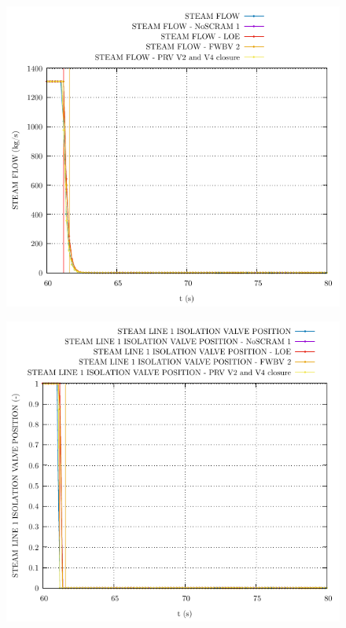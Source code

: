 \documentclass{article}
\begin{document}
\begin{multicols}{2}
\begin{figure}[H]
\includegraphics[width=\linewidth]{./graphs/STEAM FLOW.pdf}
\end{figure}
\begin{figure}[H]
\centering
\includegraphics[width=\linewidth]{./graphs/STEAM LINE 1 ISOLATION VALVE POSITION.pdf}
\end{figure}
\begin{figure}[H]
\centering

\end{figure}
\end{multicols}
\end{document}
